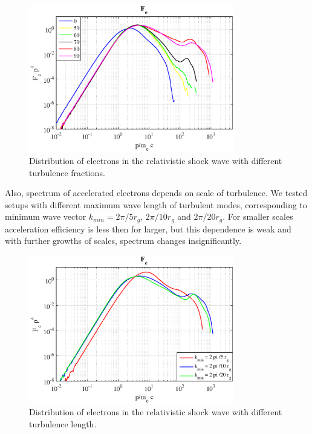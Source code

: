 \documentclass[a4paper]{jpconf}
\begin{document}
\begin{figure}[h!]
	\centering
	\includegraphics[width=0.8\textwidth]{fig/spectrum.eps} 
	\caption{Distribution of electrons in the relativistic shock wave with different turbulence fractions.}
	\label{spectrum}
\end{figure} 

Also, spectrum of accelerated electrons depends on scale of turbulence. We tested setups with different maximum wave length of turbulent modes, corresponding to minimum wave vector $k_{min} = 2 \pi / 5 r_g$, $2 \pi / 10 r_g$ and $ 2 \pi /20 r_g$. For smaller scales acceleration efficiency is less then for larger, but this dependence is weak and with further growths of scales, spectrum changes insignificantly.

\begin{figure}[h!]
	\centering
	\includegraphics[width=0.8\textwidth]{fig/spectrum_length.eps} 
	\caption{Distribution of electrons in the relativistic shock wave with different turbulence length.}
	\label{spectrum_length}
\end{figure} 
\end{document}
